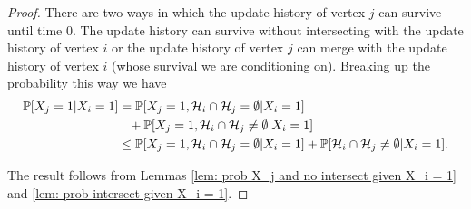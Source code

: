 \begin{proof}
	There are two ways in which the update history of vertex $j$ can survive until time $0$. The update history can survive without intersecting with the update history of vertex $i$ or the update history of vertex $j$ can merge with the update history of vertex $i$ (whose survival we are conditioning on). %
	Breaking up the probability this way we have
	\begin{align}
		\mathbb{P}[X_j = 1| X_i = 1] &= \mathbb{P}[X_j = 1, \mathcal{H}_i \cap \mathcal{H}_j = \emptyset | X_i = 1] \notag\\
		&\phantom{=}+ \mathbb{P}[X_j = 1, \mathcal{H}_i \cap \mathcal{H}_j \neq \emptyset | X_i = 1]\\
		&\leq \mathbb{P}[X_j = 1, \mathcal{H}_i \cap \mathcal{H}_j = \emptyset | X_i = 1] + \mathbb{P}[\mathcal{H}_i \cap \mathcal{H}_j \neq \emptyset | X_i = 1].
	\end{align}

	The result follows from Lemmas \ref{lem: prob X_j and no intersect given X_i = 1} and \ref{lem: prob intersect given X_i = 1}.
\end{proof}

